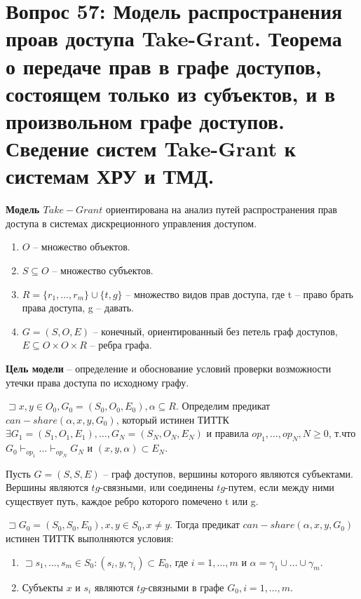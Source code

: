 \section{Вопрос 57: Модель распространения проав доступа Take-Grant. Теорема о передаче прав в графе доступов, состоящем только из субъектов, и в произвольном графе доступов. Сведение систем Take-Grant к системам ХРУ и ТМД.}

\textbf{Модель $Take-Grant$} ориентирована на анализ путей распространения прав доступа в системах дискреционного управления доступом.

\begin{defs}
	\begin{enumerate}
		\item $ O $ -- множество объектов.
		\item $S \subseteq O$ -- множество субъектов.
		\item $ R = \{ r_1, \ldots, r_m \} \cup \{ t, g \} $ -- множество видов прав доступа, где t -- право брать права доступа, g -- давать.
		\item $ G = (S, O, E) $ -- конечный, ориентированный без петель граф доступов, $E \subseteq O \times O \times R $ -- ребра графа.
	\end{enumerate}
\end{defs}

\textbf{Цель модели} -- определение и обоснование условий проверки возможности утечки права доступа по исходному графу.

\begin{defs}
	$ \sqsupset x,y \in O_0, G_0 = (S_0, O_0, E_0), \alpha   \subseteq R$. Определим предикат 
	$can-share(\alpha, x, y, G_0)$, который истинен ТИТТК $ \exists G_1 = (S_1, O_1, E_1), \ldots, 
	G_N = (S_N, O_N, E_N)$ и правила $op_1, \ldots, op_N, N \geqslant 0$, т.что 
	$G_0 \vdash_{op_1} \ldots \vdash_{op_N} G_N $ и $(x, y, \alpha) \subset E_N$.
\end{defs}

\begin{defs}[$tg$-связность]
	Пусть $G = (S, S, E)$ -- граф доступов, вершины которого являются субъектами. Вершины являются $tg$-связными, или 
	соединены $tg$-путем, если между ними существует путь, каждое ребро которого помечено t или g.
\end{defs}

\begin{proofs}
	$\sqsupset  G_0 = (S_0, S_0, E_0), x,y \in S_0, x \neq y$. Тогда предикат $can-share(\alpha, x, y, G_0)$
	истинен ТИТТК выполняются условия:
	\begin{enumerate}
		\item $ \sqsupset s_1, \ldots, s_m \in S_0 : (s_i, y, \gamma_i) \subset E_0 $, где 
		$ i = 1, \ldots, m $ и $ \alpha = \gamma_1 \cup \ldots \cup \gamma_m $.
		\item Субъекты $ x $ и $ s_i $ являются $tg$-связными в графе $G_0, i = 1, \ldots, m $.	
	\end{enumerate}
\end{proofs}

